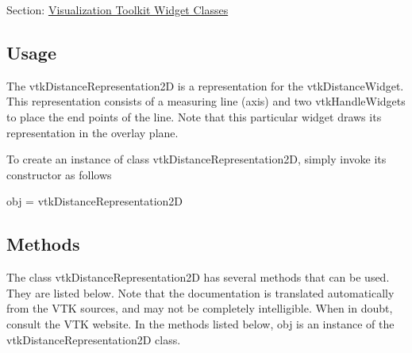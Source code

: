 Section\-: \hyperlink{sec_vtkwidgets}{Visualization Toolkit Widget Classes} \hypertarget{vtkwidgets_vtkxyplotwidget_Usage}{}\subsection{Usage}\label{vtkwidgets_vtkxyplotwidget_Usage}
The vtk\-Distance\-Representation2\-D is a representation for the vtk\-Distance\-Widget. This representation consists of a measuring line (axis) and two vtk\-Handle\-Widgets to place the end points of the line. Note that this particular widget draws its representation in the overlay plane.

To create an instance of class vtk\-Distance\-Representation2\-D, simply invoke its constructor as follows \begin{DoxyVerb}  obj = vtkDistanceRepresentation2D
\end{DoxyVerb}
 \hypertarget{vtkwidgets_vtkxyplotwidget_Methods}{}\subsection{Methods}\label{vtkwidgets_vtkxyplotwidget_Methods}
The class vtk\-Distance\-Representation2\-D has several methods that can be used. They are listed below. Note that the documentation is translated automatically from the V\-T\-K sources, and may not be completely intelligible. When in doubt, consult the V\-T\-K website. In the methods listed below, {\ttfamily obj} is an instance of the vtk\-Distance\-Representation2\-D class. 
